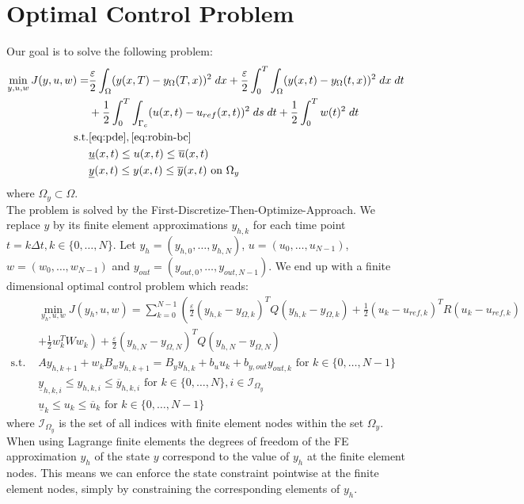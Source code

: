 \documentclass[
12pt, %
a4paper, %
onecolumn, %
portrait %
]{article}
\begin{document}
\section{Optimal Control Problem}
Our goal is to solve the following problem:
\begin{align*}
\min_{y,u, w} J(y, u, w) = & \frac{\varepsilon}{2}\int_{\Omega} (y(x, T) - y_{\Omega}(T,x))^2 \; dx + \frac{\varepsilon}{2} \int_{0}^{T} \int_{\Omega} (y(x,t) - y_{\Omega}(t,x))^2 \; dx \; dt \\
& + \frac{1}{2} \int_{0}^{T} \int_{\Gamma_c} (u(x,t) - u_{ref}(x,t))^2 \; ds \; dt + \frac{1}{2} \int_{0}^{T} w(t)^2 \; dt \\
\text{s.t.} & \eqref{eq:pde}, \eqref{eq:robin-bc} \\
& \underline{u}(x,t) \leq u(x,t) \leq \overline{u}(x,t) \\
& \underline{y}(x,t) \leq y(x,t) \leq \overline{y}(x,t) \text{ on } \Omega_y
\end{align*}
where $\Omega_y \subset \Omega$.
\\
The problem is solved by the First-Discretize-Then-Optimize-Approach.
We replace $y$ by its finite element approximations $y_{h,k}$ for each time point $t = k \Delta t, k \in \{0, \hdots, N\}$. Let $y_h = (y_{h,0}, \hdots, y_{h,N})$, $u = (u_0, \hdots, u_{N-1})$, $w = (w_0, \hdots, w_{N-1})$ and $y_{out} = (y_{out,0}, \hdots, y_{out,N-1})$.
We end up with a finite dimensional optimal control problem which reads:
\begin{align*}
& \min_{y_h,u, w} J(y_h, u, w) = \sum_{k=0}^{N-1} \left( \frac{\varepsilon}{2} (y_{h,k} - y_{\Omega,k})^T Q (y_{h,k} - y_{\Omega,k}) + \frac{1}{2} (u_k - u_{ref,k})^T R (u_k - u_{ref,k}) \right. \\  & \left. + \frac{1}{2} w_k^T W w_k \right) + \frac{\varepsilon}{2} (y_{h,N} - y_{\Omega,N})^T Q (y_{h,N} - y_{\Omega,N}) \\
\text{s.t. }  & A y_{h,k+1} + w_k B_w y_{h,k+1} = B_y y_{h,k} + b_u u_k + b_{y,out} y_{out,k} \text{ for } k \in \{0, \hdots, N-1\} \\
&\underline{y}_{h,k,i} \leq y_{h,k,i} \leq \overline{y}_{h,k,i} \text{ for } k \in \{0, \hdots, N\}, i \in \mathcal{I}_{\Omega_y} \\
&\underline{u}_{k} \leq u_{k} \leq \overline{u}_{k} \text{ for } k \in \{0, \hdots, N-1\}
\end{align*}
where $\mathcal{I}_{\Omega_y}$ is the set of all indices with finite element nodes within the set $\Omega_y$. When using Lagrange finite elements the degrees of freedom of the FE approximation $y_h$ of the state $y$ correspond to the value of $y_h$ at the finite element nodes. This means we can enforce the state constraint pointwise at the finite element nodes, simply by constraining the corresponding elements of $y_h$. \\
\end{document}
